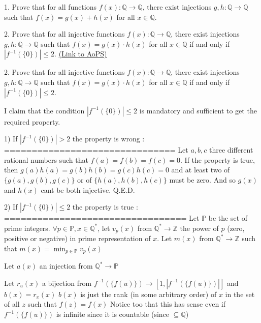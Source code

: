\begin{problem}
	1. Prove that for all functions $f(x): \mathbb{Q} \to\mathbb{Q}$, there exist injections $g,h: \mathbb{Q} \to \mathbb{Q}$ such that $f(x)=g(x)+h(x)$ for all $x \in \mathbb{Q}$.

2. Prove that for all injective functions $f(x): \mathbb{Q} \to\mathbb{Q}$, there exist injections $g,h: \mathbb{Q} \to \mathbb{Q}$ such that $f(x)=g(x)\cdot h(x)$ for all $x \in \mathbb{Q}$ if and only if $|f^{-1}(\{0\})|\le 2$.
	\flushright \href{https://artofproblemsolving.com/community/c6h411686}{(Link to AoPS)}
\end{problem}



\begin{solution}
	\begin{tcolorbox}
2. Prove that for all injective functions $f(x): \mathbb{Q} \to\mathbb{Q}$, there exist injections $g,h: \mathbb{Q} \to \mathbb{Q}$ such that $f(x)=g(x)\cdot h(x)$ for all $x \in \mathbb{Q}$ if and only if $|f^{-1}(\{0\})|\le 2$.\end{tcolorbox}


I claim that the condition $|f^{-1}(\{0\})|\le 2$ is mandatory and sufficient to get the required property.

1) If $|f^{-1}(\{0\})|>2$ the property is wrong :
===============================
Let $a,b,c$ three different rational numbers such that $f(a)=f(b)=f(c)=0$.
If the property is true, then $g(a)h(a)=g(b)h(b)=g(c)h(c)=0$ and at least two of $\{g(a),g(b),g(c)\}$ or of $\{h(a),h(b),h(c)\}$ must be zero.
And so $g(x)$ and $h(x)$ cant be both injective.
Q.E.D.

2) If $|f^{-1}(\{0\})|\le 2$ the property is true :
=================================
Let $\mathbb P$ be the set of prime integers.
$\forall p\in\mathbb P,x\in\mathbb Q^*$, let $v_p(x)$ from $\mathbb Q^*\to\mathbb Z$ the power of $p$ (zero, positive or negative) in prime representation of $x$.
Let $m(x)$ from $\mathbb Q^*\to\mathbb Z$ such that $m(x)=\min_{p\in\mathbb P}v_p(x)$

Let $a(x)$ an injection from $\mathbb Q^*\to\mathbb P$

Let $r_u(x)$ a bijection from $f^{-1}(\{f(u)\})\to[1,|f^{-1}(\{f(u)\})|]$ and $b(x)=r_x(x)$
$b(x)$ is just the rank (in some arbitrary order) of $x$ in the set of all $z$ such that $f(z)=f(x)$
Notice too that this has sense even if $f^{-1}(\{f(u)\})$ is infinite since it is countable (since $\subseteq\mathbb Q$)


\end{solution}
